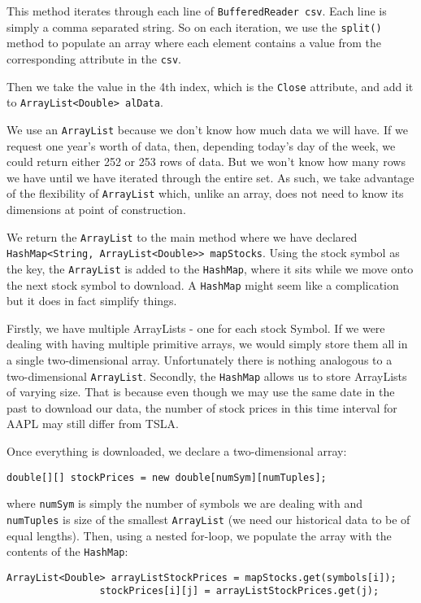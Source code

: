 \documentclass[../Dissertation.tex]{subfiles}
\begin{document}
This method iterates through each line of \lstinline|BufferedReader csv|.
Each line is simply a comma separated string. 
So on each iteration, we use the \lstinline|split()| method to populate an array where each element contains a value from the corresponding attribute in the \lstinline|csv|.

Then we take the value in the 4th index, which is the \lstinline|Close| attribute, and add it to \lstinline|ArrayList<Double> alData|.


We use an \lstinline|ArrayList| because we don't know how much data we will have.
If we request one year's worth of data, then, depending today's day of the week, we could return either 252 or 253 rows of data.
But we won't know how many rows we have until we have iterated through the entire set.
As such, we take advantage of the flexibility of \lstinline|ArrayList| which, unlike an array, does not need to know its dimensions at point of construction.

We return the \lstinline|ArrayList| to the main method where we have declared \lstinline|HashMap<String, ArrayList<Double>> mapStocks|.
Using the stock symbol as the key, the \lstinline|ArrayList| is added to the \lstinline|HashMap|, where it sits while we move onto the next stock symbol to download.
A \lstinline|HashMap| might seem like a complication but it does in fact simplify things.

Firstly, we have multiple ArrayLists - one for each stock Symbol.
If we were dealing with having multiple primitive arrays, we would simply store them all in a single two-dimensional array.
Unfortunately there is nothing analogous to a two-dimensional \lstinline|ArrayList|.
Secondly, the \lstinline|HashMap| allows us to store ArrayLists of varying size.
That is because even though we may use the same date in the past to download our data, the number of stock prices in this time interval for AAPL may still differ from TSLA.

Once everything is downloaded, we declare a two-dimensional array:
\begin{lstlisting}[firstnumber = 78]
double[][] stockPrices = new double[numSym][numTuples];
\end{lstlisting}
where \lstinline|numSym| is simply the number of symbols we are dealing with and \lstinline|numTuples| is size of the smallest \lstinline|ArrayList| (we need our historical data to be of equal lengths).
Then, using a nested for-loop, we populate the array with the contents of the \lstinline|HashMap|:
\begin{lstlisting}[firstnumber = 82]
ArrayList<Double> arrayListStockPrices = mapStocks.get(symbols[i]);
                stockPrices[i][j] = arrayListStockPrices.get(j);
\end{lstlisting}                
\end{document}

